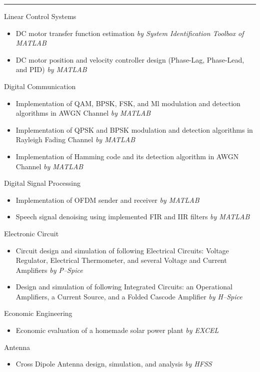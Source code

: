 \documentclass[a4paper,10pt]{article}
\newlength{\cvcolumngapwidth}
\newlength{\cvleftcolumnwidth}
\newlength{\cvrightcolumnwidth}
\newcommand{\cvsectionstyle}[1]{{\normalsize\cvsectionfont\textcolor{cvsectioncolor}{#1}}}
\newcommand{\cvheadingstyle}[1]{{\normalsize\cvheadingfont\textcolor{cvheadingcolor}{#1}}}
\newlength{\cvafteritemskipamount}
\newlength{\cvaftersectionskipamount}
\newlength{\cvbetweensectionandheadingextraskipamount}
\newlength{\cvparskip}
\newcommand{\cvsection}[1]{
    \begin{minipage}[t]{\cvleftcolumnwidth}
        \raggedleft\cvsectionstyle{#1}
    \end{minipage}%
    \hspace{\cvcolumngapwidth}%
    \begin{minipage}[t]{\cvrightcolumnwidth}
        \textcolor{cvrulecolor}{\rule{\cvrightcolumnwidth}{0.3mm}}
    \end{minipage}

    \vspace{\cvaftersectionskipamount}
}
\newcommand{\cvitem}[2]{
    \begin{minipage}[t]{\cvleftcolumnwidth}
        \raggedleft #1
    \end{minipage}%
    \hspace{\cvcolumngapwidth}%
    \begin{minipage}[t]{\cvrightcolumnwidth}
        \setlength{\parskip}{\cvparskip} #2
    \end{minipage}

    \vspace{\cvafteritemskipamount}
}
\begin{document}

\cvsection{Course Project}
\vspace{\cvbetweensectionandheadingextraskipamount}
\cvitem{
    \cvheadingstyle{Linear Control Systems}
}{
    \begin{itemize}[leftmargin=*]
        \item DC motor transfer function estimation \textit{\small{by System Identification Toolbox of MATLAB}}
        \item DC motor position and velocity controller design (Phase-Lag, Phase-Lead, and PID) \textit{\small{by MATLAB}}
    \end{itemize}
}
\cvitem{
    \cvheadingstyle{Digital Communication}
}{
    \begin{itemize}[leftmargin=*]
        \item Implementation of QAM, BPSK, FSK, and Ml modulation and detection algorithms in AWGN Channel \textit{\small{by MATLAB}}
        \item Implementation of QPSK and BPSK modulation and detection algorithms in Rayleigh Fading Channel \textit{\small{by MATLAB}}
        \item Implementation of Hamming code and its detection algorithm in AWGN Channel \textit{\small{by MATLAB}}

    \end{itemize}
}
\cvitem{
    \cvheadingstyle{Digital Signal Processing}
}{
    \begin{itemize}[leftmargin=*]
        \item Implementation of OFDM sender and receiver \textit{\small{by MATLAB}}
        \item Speech signal denoising using implemented FIR and IIR filters  \textit{\small{by MATLAB}}
    \end{itemize}
}
\cvitem{
    \cvheadingstyle{Electronic Circuit}
}{
    \begin{itemize}[leftmargin=*]
        \item Circuit design and simulation of following Electrical Circuits: Voltage Regulator, Electrical Thermometer,
              and several Voltage and Current Amplifiers \textit{\small{by P–Spice}}
        \item Design and simulation of following Integrated Circuits: an Operational Amplifiers, a Current Source,
              and a Folded Cascode Amplifier \textit{\small{by H–Spice}}
    \end{itemize}
}
\cvitem{
    \cvheadingstyle{Economic Engineering}
}{
    \begin{itemize}[leftmargin=*]
        \item Economic evaluation of a homemade solar power plant \textit{\small{by EXCEL}}
    \end{itemize}
}
\cvitem{
    \cvheadingstyle{Antenna}
}{
    \begin{itemize}[leftmargin=*]
        \item Cross Dipole Antenna design, simulation, and analysis \textit{\small{by HFSS}}
    \end{itemize}
}
\end{document}
